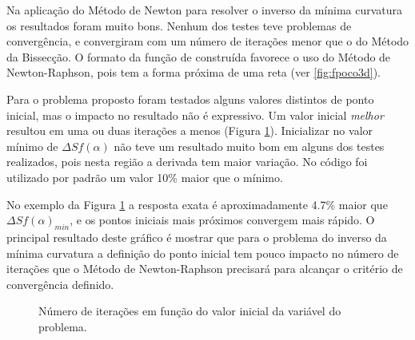 \documentclass[final,5p]{elsarticle}
\numberwithin{equation}{section}
\begin{document}
    Na aplicação do Método de Newton para resolver o inverso da mínima curvatura os resultados foram muito bons. Nenhum dos testes teve problemas de convergência, e convergiram com um número de iterações menor que o do Método da Bissecção. O formato da função de construída favorece o uso do Método de Newton-Raphson, pois tem a forma próxima de uma reta (ver \ref{fig:fpoco3d}).

    Para o problema proposto foram testados alguns valores distintos de ponto inicial, mas o impacto no resultado não é expressivo. Um valor inicial \emph{melhor} resultou em uma ou duas iterações a menos (Figura \ref{fig:pontoinicial}). Inicializar no valor mínimo de $\Delta S f(\alpha)$ não teve um resultado muito bom em alguns dos testes realizados, pois nesta região a derivada tem maior variação. No código foi utilizado por padrão um valor 10\% maior que o mínimo. 

    No exemplo da Figura \ref{fig:pontoinicial} a resposta exata é aproximadamente 4.7\% maior que $\Delta S f(\alpha)_{min}$, e os pontos iniciais mais próximos convergem mais rápido. O principal resultado deste gráfico é mostrar que para o problema do inverso da mínima curvatura a definição do ponto inicial tem pouco impacto no número de iterações que o Método de Newton-Raphson precisará para alcançar o critério de convergência definido. 

    \begin{figure}[hbt!]
        \label{fig:pontoinicial}
        \centering
        \caption{Número de iterações em função do valor inicial da variável do problema.}
    \end{figure}
\end{document}
